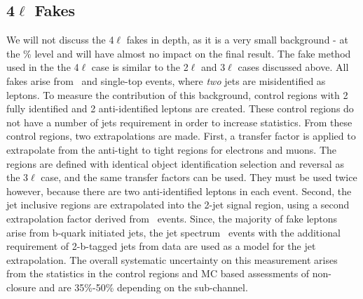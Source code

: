 \subsection{4$\ell$ Fakes}

We will not discuss the 4$\ell$ fakes in depth, as it is a very small background - at the \% level and will have almost no impact on the final result. The fake method used in the the 4$\ell$ case is similar to the 2$\ell$ and 3$\ell$ cases discussed above. All fakes arise from \ttbar\ and single-top events, where \textit{two} jets are misidentified as leptons. To measure the contribution of this background, control regions with 2 fully identified and 2 anti-identified leptons are created. These control regions do not have a number of jets requirement in order to increase statistics.  From these control regions, two extrapolations are made. First, a transfer factor is applied to extrapolate from the anti-tight to tight regions for electrons and muons. The regions are defined with identical object identification selection and reversal as the 3$\ell$ case, and the same transfer factors can be used. They must be used twice however, because there are two anti-identified leptons in each event. Second, the jet inclusive regions are extrapolated into the 2-jet signal region, using a second extrapolation factor derived from \ttbar\ events. Since, the majority of fake leptons arise from b-quark initiated jets, the jet spectrum \ttbar\ events with the additional requirement of 2-b-tagged jets from data are used as a model for the jet extrapolation. The overall systematic uncertainty on this measurement arises from the statistics in the control regions and MC based assessments of non-closure and are 35\%-50\% depending on the sub-channel. 


